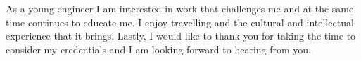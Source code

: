\documentclass[11pt,a4paper,sans]{moderncv} %
\begin{document}
As a young engineer I am interested in work that challenges me and at the same time continues to educate me.
I enjoy travelling and the cultural and intellectual experience that it brings.
Lastly, I would like to thank you for taking the time to consider my credentials and I am looking forward to hearing from you.

\makeletterclosing %

\end{document}
